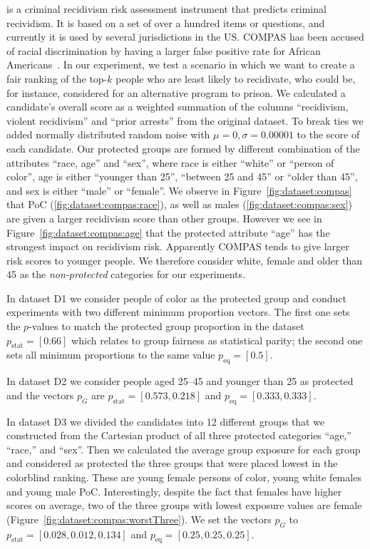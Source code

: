  is a criminal recidivism risk assessment instrument that predicts criminal recividism. It is based on a set of over a hundred items or questions, and currently it is used by several jurisdictions in the US.
%
COMPAS has been accused of racial discrimination by having a larger false positive rate for African Americans~\cite{angwin_2016_machine}.
%
In our experiment, we test a scenario in which we want to create a fair ranking of the top-$k$ people who are least likely to recidivate, who could be, for instance, considered for an alternative program to prison.
%
We calculated a candidate's overall score as a weighted summation of the columns ``recidivism, violent recidivism'' and ``prior arrests'' from the original dataset.
%
To break ties we added normally distributed random noise with $\mu=0, \sigma=0.00001$ to the score of each candidate.
%
Our protected groups are formed by different combination of the attributes ``race, age'' and ``sex'', where race is either ``white'' or ``person of color'', age is either ``younger than 25'', ``between 25 and 45'' or ``older than 45'', and sex is either ``male'' or ``female''.
%
We observe in Figure~\ref{fig:dataset:compas} that PoC (\ref{fig:dataset:compas:race}), as well as males (\ref{fig:dataset:compas:sex}) are given a larger recidivism score than other groups.
%
However we see in Figure~\ref{fig:dataset:compas:age} that the protected attribute ``age'' has the strongest impact on recidivism risk.
%
Apparently COMPAS tends to give larger risk scores to younger people.
%
We therefore consider white, female and older than 45 as the \emph{non-protected} categories for our experiments.


In dataset D1 we consider people of color as the protected group and conduct experiments with two different minimum proportion vectors.
%
The first one sets the $p$-values to match the protected group proportion in the dataset $p_{\text{stat}}=[0.66]$ which relates to group fairness as statistical parity; the second one sets all minimum proportions to the same value $p_{\text{eq}}=[0.5]$.


In dataset D2 we consider people aged 25--45 and younger than 25 as protected and the vectors $p_G$ are $p_{\text{stat}}=[0.573,0.218]$ and $p_{\text{eq}}=[0.333, 0.333]$.


In dataset D3 we divided the candidates into 12 different groups that we constructed from the Cartesian product of all three protected categories ``age,'' ``race,'' and ``sex''.
%
Then we calculated the average group exposure for each group and considered as protected the three groups that were placed lowest in the colorblind ranking.
%
These are young female persons of color, young white females and young male PoC.
%
Interestingly, despite the fact that females have higher scores on average, two of the three groups with lowest exposure values are female (Figure~\ref{fig:dataset:compas:worstThree}).
%
We set the vectors $p_G$ to $p_{\text{stat}}=[0.028,0.012,0.134]$ and $p_{\text{eq}}=[0.25,0.25,0.25]$.


